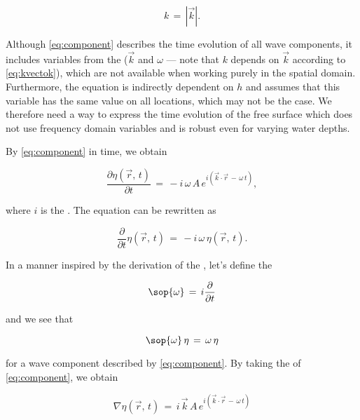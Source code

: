 \begin{equation} \label{eq:kvectok}
k \,=\, \left|\vec{k}\right|.
\end{equation}

Although \eqref{eq:component} describes the time evolution of all wave components, it includes variables from the  ($\vec{k}$ and $\omega$ --- note that $k$ depends on $\vec{k}$ according to \eqref{eq:kvectok}), which are not available when working purely in the spatial domain. Furthermore, the equation is indirectly dependent on $h$ and assumes that this variable has the same value on all locations, which may not be the case. We therefore need a way to express the time evolution of the free surface which does not use frequency domain variables and is robust even for varying water depths.

By  \eqref{eq:component} in time, we obtain

\begin{equation}
\frac{\partial\eta(\vec{r},\,t)}{\partial t} \,=\, -i\,\omega\,A\,e^{i(\vec{k}\cdot\vec{r}\,-\,\omega\,t)},
\end{equation}

where $i$ is the . The equation can be rewritten as

\begin{equation}
\frac{\partial}{\partial t}\eta(\vec{r},\,t) \,=\, -i\,\omega\,\eta(\vec{r},\,t).
\end{equation}

In a manner inspired by the derivation of the  \citep{Bransden2000}, let's define the 

\begin{equation} \label{eq:opomega}
\sop{\omega} \,=\, i\frac{\partial}{\partial t}
\end{equation}

and we see that

\begin{equation} \label{eq:opomegaaction}
\sop{\omega}\,\eta \,=\, \omega\,\eta
\end{equation}

for a wave component described by \eqref{eq:component}. By taking the  of \eqref{eq:component}, we obtain

\begin{equation}
\nabla\eta(\vec{r},\,t) \,=\, i\,\vec{k}\,A\,e^{i(\vec{k}\cdot\vec{r}\,-\,\omega\,t)}
\end{equation}

